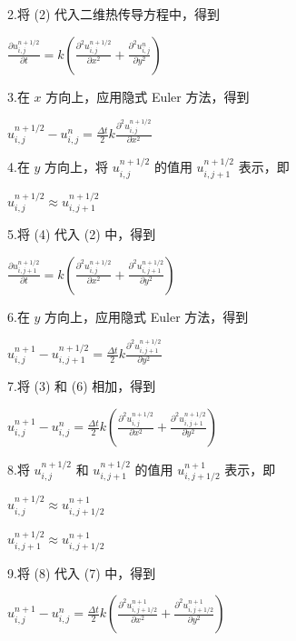 \documentclass[12pt, a4paper, oneside]{ctexart}
\begin{document}
\begin{spacing}{2.0}
2.将 (2) 代入二维热传导方程中，得到
\begin{center}
    $\displaystyle \frac{\partial u^{n+1/2}_{i,j}}{\partial t} = k\left(\frac{\partial^2 u^{n+1/2}_{i,j}}{\partial x^2} + \frac{\partial^2 u^{n}_{i,j}}{\partial y^2}\right)$
\end{center}

3.在 $x$ 方向上，应用隐式 Euler 方法，得到
\begin{center}
    $\displaystyle u^{n+1/2}_{i,j} - u^{n}_{i,j} = \frac{\Delta t}{2} k\frac{\partial^2 u^{n+1/2}_{i,j}}{\partial x^2}$
\end{center}

4.在 $y$ 方向上，将 $u^{n+1/2}_{i,j}$ 的值用 $u^{n+1/2}_{i,j+1}$ 表示，即
\begin{center}
    $\displaystyle u^{n+1/2}_{i,j} \approx u^{n+1/2}_{i,j+1}$
\end{center}

5.将 (4) 代入 (2) 中，得到
\begin{center}
    $\displaystyle \frac{\partial u^{n+1/2}_{i,j+1}}{\partial t} = k\left(\frac{\partial^2 u^{n+1/2}_{i,j}}{\partial x^2} + \frac{\partial^2 u^{n+1/2}_{i,j+1}}{\partial y^2}\right)$
\end{center}
6.在 $y$ 方向上，应用隐式 Euler 方法，得到
\begin{center}
    $\displaystyle u^{n+1}_{i,j} - u^{n+1/2}_{i,j+1} = \frac{\Delta t}{2} k\frac{\partial^2 u^{n+1/2}_{i,j+1}}{\partial y^2}$
\end{center}

7.将 (3) 和 (6) 相加，得到
\begin{center}
    $\displaystyle u^{n+1}_{i,j} - u^{n}_{i,j} = \frac{\Delta t}{2} k\left(\frac{\partial^2 u^{n+1/2}_{i,j}}{\partial x^2} + \frac{\partial^2 u^{n+1/2}_{i,j+1}}{\partial y^2}\right)$
\end{center}

8.将 $u^{n+1/2}_{i,j}$ 和 $u^{n+1/2}_{i,j+1}$ 的值用 $u^{n+1}_{i,j+1/2}$ 表示，即
\begin{center}
    $\displaystyle u^{n+1/2}_{i,j} \approx u^{n+1}_{i,j+1/2}$
\end{center}

\begin{center}
    $\displaystyle u^{n+1/2}_{i,j+1} \approx u^{n+1}_{i,j+1/2}$
\end{center}

9.将 (8) 代入 (7) 中，得到
\begin{center}
    $\displaystyle u^{n+1}_{i,j} - u^{n}_{i,j} = \frac{\Delta t}{2} k\left(\frac{\partial^2 u^{n+1}_{i,j+1/2}}{\partial x^2} + \frac{\partial^2 u^{n+1}_{i,j+1/2}}{\partial y^2}\right)$
\end{center}


\end{spacing}
\end{document}
